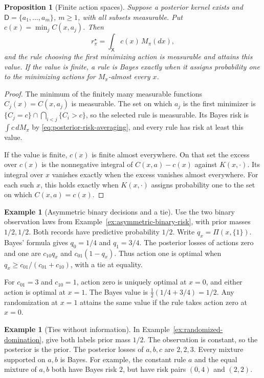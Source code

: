 \documentclass[11pt,oneside]{book}
\newtheorem{proposition}[theorem]{Proposition}
\theoremstyle{definition}
\newtheorem{example}[theorem]{Example}
\theoremstyle{remark}
\begin{document}
\begin{proposition}[Finite action spaces]
\label{prop:finite-bayes-action}
Suppose a posterior kernel exists and $\mathsf D=\{a_1,\ldots,a_m\}$,
$m\geq1$, with all subsets measurable. Put $c(x)=\min_j C(x,a_j)$.
Then
\[
r_\pi^\star=\int_{\mathsf X}c(x)\,M_\pi(dx),
\]
and the rule choosing the first minimizing action is measurable and
attains this value. If the value is finite, a rule is Bayes exactly
when it assigns probability one to the minimizing actions for
$M_\pi$-almost every $x$.
\end{proposition}
\begin{proof}
The minimum of the finitely many measurable functions $C_j(x)=C(x,a_j)$
is measurable. The set on which $a_j$ is the first minimizer is
$\{C_j=c\}\cap\bigcap_{i<j}\{C_i>c\}$, so the selected rule is measurable.
Its Bayes risk is $\int c\,dM_\pi$ by
\eqref{eq:posterior-risk-averaging}, and every rule has risk at least
this value.

If the value is finite, $c(x)$ is finite almost everywhere. On that
set the excess over $c(x)$ is the nonnegative integral of
$C(x,a)-c(x)$ against $K(x,\cdot)$. Its integral over $x$ vanishes
exactly when the excess vanishes almost everywhere. For each such
$x$, this holds exactly when $K(x,\cdot)$ assigns probability one
to the set on which $C(x,a)=c(x)$.
\end{proof}

\begin{example}[Asymmetric binary decisions and a tie]
\label{ex:binary-bayes-actions}
Use the two binary observation laws from
Example~\ref{ex:asymmetric-binary-risk}, with prior masses $1/2,1/2$.
Both records have predictive probability $1/2$. Write $q_x=\Pi(x,\{1\})$.
Bayes' formula gives $q_0=1/4$ and $q_1=3/4$.
The posterior losses of actions zero and one are
$c_{10}q_x$ and $c_{01}(1-q_x)$. Thus action one is optimal when
$q_x\geq c_{01}/(c_{01}+c_{10})$, with a tie at equality.

For $c_{01}=3$ and $c_{10}=1$, action zero is uniquely optimal at
$x=0$, and either action is optimal at $x=1$. The Bayes value is
$\tfrac12(1/4+3/4)=1/2$. Any randomization at $x=1$ attains the same value
if the rule takes action zero at $x=0$.
\end{example}

\begin{example}[Ties without information]
\label{ex:bayes-ties-no-information}
In Example~\ref{ex:randomized-domination}, give both labels prior mass
$1/2$. The observation is constant, so the posterior is the prior.
The posterior losses of $a,b,c$ are $2,2,3$. Every mixture supported on
$a,b$ is Bayes. For example, the constant rule $a$ and the equal mixture
of $a,b$ both have Bayes risk $2$, but have risk pairs $(0,4)$ and $(2,2)$.
\end{example}
\end{document}

